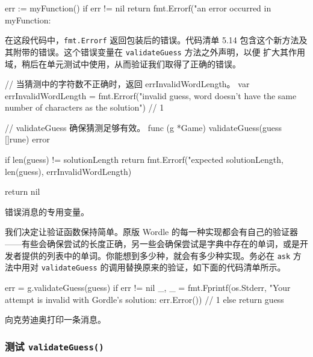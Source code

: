 \begin{gocode}[]
err := myFunction()
if err != nil {
    return fmt.Errorf("an error occurred in myFunction: %
}
\end{gocode}

在这段代码中，\texttt{fmt.Errorf} 返回包装后的错误。代码清单 5.14 包含这个新方法及其附带的错误。这个错误变量在 \texttt{validateGuess} 方法之外声明，以便
扩大其作用域，稍后在单元测试中使用，从而验证我们取得了正确的错误。

\begin{gocode}[title={代码清单 5.14 \texttt{game.go}：\texttt{validateGuess} 方法}]
// 当猜测中的字符数不正确时，返回 errInvalidWordLength。
var errInvalidWordLength = fmt.Errorf("invalid guess, word doesn't have the same number of characters as the solution") // 1

// validateGuess 确保猜测足够有效。
func (g *Game) validateGuess(guess []rune) error {
    if len(guess) != solutionLength {
        return fmt.Errorf("expected %
            solutionLength, len(guess), errInvalidWordLength)
    }

    return nil
}
\end{gocode}

\begin{codeannotations}
  \item 错误消息的专用变量。
\end{codeannotations}

我们决定让验证函数保持简单。原版 Wordle 的每一种实现都会有自己的验证器——有些会确保尝试的长度正确，另一些会确保尝试是字典中存在的单词，或是开发者提供的列表中的单词。你能想到多少种，就会有多少种实现。务必在 \texttt{ask} 方法中用对 \texttt{validateGuess} 的调用替换原来的验证，如下面的代码清单所示。

\begin{gocode}[title={代码清单 5.15 \texttt{game.go}：在 \texttt{ask} 方法中调用 \texttt{validateGuess}}]
err = g.validateGuess(guess)
if err != nil {
    _, _ = fmt.Fprintf(os.Stderr,
        "Your attempt is invalid with Gordle's solution: %
        err.Error()) // 1
} else {
    return guess
}
\end{gocode}

\begin{codeannotations}
  \item 向克劳迪奥打印一条消息。
\end{codeannotations}

\subsubsection*{测试 \texttt{validateGuess()}}


